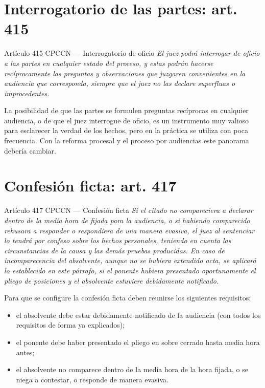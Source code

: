 \documentclass[12pt,oneside]{book}
\begin{document}
\section{Interrogatorio de las partes: art. 415}

\begin{norma}{Artículo 415 CPCCN --- Interrogatorio de oficio}
\textit{El juez podrá interrogar de oficio a las partes en cualquier estado del proceso, y estas podrán hacerse recíprocamente las preguntas y observaciones que juzgaren convenientes en la audiencia que corresponda, siempre que el juez no las declare superfluas o improcedentes.}
\end{norma}

La posibilidad de que las partes se formulen preguntas recíprocas en cualquier audiencia, o de que el juez interrogue de oficio, es un instrumento muy valioso para esclarecer la verdad de los hechos, pero en la práctica se utiliza con poca frecuencia. Con la reforma procesal y el proceso por audiencias este panorama debería cambiar.

\section{Confesión ficta: art. 417}

\begin{norma}{Artículo 417 CPCCN --- Confesión ficta}
\textit{Si el citado no compareciera a declarar dentro de la media hora de fijada para la audiencia, o si habiendo comparecido rehusara a responder o respondiera de una manera evasiva, el juez al sentenciar lo tendrá por confeso sobre los hechos personales, teniendo en cuenta las circunstancias de la causa y las demás pruebas producidas. En caso de incomparecencia del absolvente, aunque no se hubiera extendido acta, se aplicará lo establecido en este párrafo, si el ponente hubiera presentado oportunamente el pliego de posiciones y el absolvente estuviere debidamente notificado.}
\end{norma}

Para que se configure la confesión ficta deben reunirse los siguientes requisitos:
\begin{itemize}
    \item el absolvente debe estar debidamente notificado de la audiencia (con todos los requisitos de forma ya explicados);
    \item el ponente debe haber presentado el pliego en sobre cerrado hasta media hora antes;
    \item el absolvente no comparece dentro de la media hora de la hora fijada, o se niega a contestar, o responde de manera evasiva.
\end{itemize}
\end{document}
